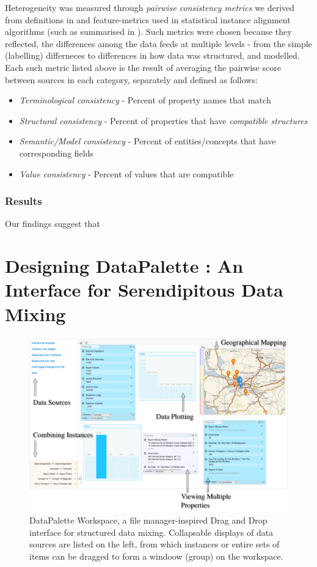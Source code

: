 \documentclass{sigchi}
\begin{document}
Heterogeneity was measured through \emph{pairwise consistency metrics} we derived from definitions in \cite{george2005understanding} and feature-metrics used in statistical instance alignment algorithms (such as summarised in \cite{bhattacharya2007collective}). Such metrics were chosen because they reflected, the differences among the data feeds at multiple levels - from the simple (labelling) differneces to differences in how data was structured, and modelled. Each such metric listed above is the result of averaging the pairwise score between sources in each category, separately and defined as follows:

\begin{itemize}
\item \emph{Terminological consistency} - Percent of property names that match
\item \emph{Structural consistency} - Percent of properties that have \emph{compatible structures}
\item \emph{Semantic/Model consistency} - Percent of entities/concepts that have corresponding fields 
\item \emph{Value consistency} - Percent of values that are compatible
\end{itemize}

\subsubsection{Results}
Our findings suggest that 

\section{Designing DataPalette : An Interface for Serendipitous Data Mixing}
\begin{figure}[htbp]
\begin{center}
\includegraphics[width=18cm]{img/screenshot}
\caption{DataPalette Workspace, a file manager-inspired Drag and Drop interface for structured data mixing. Collapsable displays of data sources are listed on the left, from which instances or entire sets of items can be dragged to form a windoow (group) on the workspace.}
\label{fig:workspace}
\end{center}
\end{figure}
\end{document}
